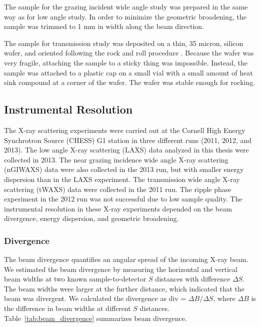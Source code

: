 The sample for the grazing incident wide angle study was prepared in the same way 
as for low angle study. In order to minimize the geometric broadening, the 
sample was trimmed to 1 mm in width along the beam direction.

The sample for transmission study was deposited on a thin, 35 micron, silicon
wafer, and oriented following the rock and roll procedure \cite{Tristram-Nagle07_MMB}.  
Because the wafer was very fragile, attaching the sample to a sticky 
thing was impossible. Instead, the sample was attached to a plastic cap on 
a small vial with a small amount of heat sink compound at a corner of the 
wafer. The wafer was stable enough for rocking. 

\subsection{Instrumental Resolution}\label{sec:instrumental_resolution}
The X-ray scattering experiments were carried out at the Cornell 
High Energy Synchrotron Source (CHESS) G1 station in three different runs
(2011, 2012, and 2013). 
The low angle X-ray scattering (LAXS) data analyzed 
in this thesis were collected in 2013.
The near grazing incidence wide angle X-ray scattering (nGIWAXS) data were also collected
in the 2013 run, but with smaller energy dispersion than in the LAXS experiment.
The transmission wide angle X-ray scattering (tWAXS) data were collected
in the 2011 run. The ripple phase experiment in the 2012 run was not successful
due to low sample quality.
The instrumental resolution in these X-ray experiments depended on the beam
divergence, energy dispersion, and geometric broadening. 

\subsubsection{Divergence}\label{sec:divergence}
The beam divergence quantifies an angular spread of the incoming X-ray
beam. We estimated the beam divergence by measuring the horizontal and 
vertical beam widths at two known sample-to-detector $S$ distances
with difference $\Delta S$. 
The beam widths were larger at the further distance, which indicated 
that the beam was divergent. 
We calculated the divergence as div = $\Delta B/\Delta S$, where
$\Delta B$ is the difference in beam widths at different $S$ distances.
Table~\ref{tab:beam_divergence} summarizes beam divergence.

